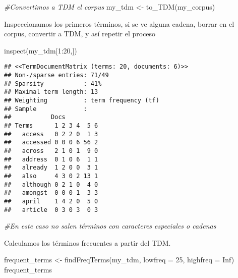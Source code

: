 \documentclass[
]{book}
\newenvironment{Shaded}{\begin{snugshade}}{\end{snugshade}}
\newcommand{\AttributeTok}[1]{\textcolor[rgb]{0.77,0.63,0.00}{#1}}
\newcommand{\CommentTok}[1]{\textcolor[rgb]{0.56,0.35,0.01}{\textit{#1}}}
\newcommand{\ConstantTok}[1]{\textcolor[rgb]{0.00,0.00,0.00}{#1}}
\newcommand{\DecValTok}[1]{\textcolor[rgb]{0.00,0.00,0.81}{#1}}
\newcommand{\FunctionTok}[1]{\textcolor[rgb]{0.00,0.00,0.00}{#1}}
\newcommand{\NormalTok}[1]{#1}
\newcommand{\OtherTok}[1]{\textcolor[rgb]{0.56,0.35,0.01}{#1}}
\newcommand{\SpecialCharTok}[1]{\textcolor[rgb]{0.00,0.00,0.00}{#1}}
\begin{document}
\begin{Shaded}
\begin{Highlighting}[]
\CommentTok{\#Convertimos a TDM el corpus}
\NormalTok{my\_tdm }\OtherTok{\textless{}{-}} \FunctionTok{to\_TDM}\NormalTok{(my\_corpus)}
\end{Highlighting}
\end{Shaded}

Inspeccionamos los primeros términos, si se ve alguna cadena, borrar en el corpus, convertir a TDM, y así repetir el proceso

\begin{Shaded}
\begin{Highlighting}[]
\FunctionTok{inspect}\NormalTok{(my\_tdm[}\DecValTok{1}\SpecialCharTok{:}\DecValTok{20}\NormalTok{,])}
\end{Highlighting}
\end{Shaded}

\begin{verbatim}
## <<TermDocumentMatrix (terms: 20, documents: 6)>>
## Non-/sparse entries: 71/49
## Sparsity           : 41%
## Maximal term length: 13
## Weighting          : term frequency (tf)
## Sample             :
##           Docs
## Terms      1 2 3 4  5 6
##   access   0 2 2 0  1 3
##   accessed 0 0 0 6 56 2
##   across   2 1 0 1  9 0
##   address  0 1 0 6  1 1
##   already  1 2 0 0  3 1
##   also     4 3 0 2 13 1
##   although 0 2 1 0  4 0
##   amongst  0 0 0 1  3 3
##   april    1 4 2 0  5 0
##   article  0 3 0 3  0 3
\end{verbatim}

\begin{Shaded}
\begin{Highlighting}[]
\CommentTok{\#En este caso no salen términos con caracteres especiales o cadenas}
\end{Highlighting}
\end{Shaded}

Calculamos los términos frecuentes a partir del TDM.

\begin{Shaded}
\begin{Highlighting}[]
\NormalTok{frequent\_terms }\OtherTok{\textless{}{-}}  \FunctionTok{findFreqTerms}\NormalTok{(my\_tdm, }
              \AttributeTok{lowfreq =} \DecValTok{25}\NormalTok{, }
              \AttributeTok{highfreq =} \ConstantTok{Inf}\NormalTok{)}
\NormalTok{frequent\_terms}
\end{Highlighting}
\end{Shaded}
\end{document}
